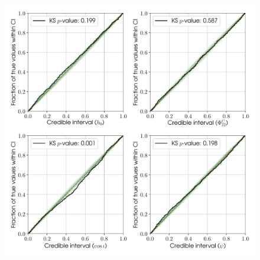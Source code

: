 \begin{figure}[!phtb]
\begin{center}
\includegraphics[width=1\columnwidth]{./figures/codeeval/stats/pp_standard/pp_plots_standard}
\caption{ \protect}
\end{center}
\end{figure}


